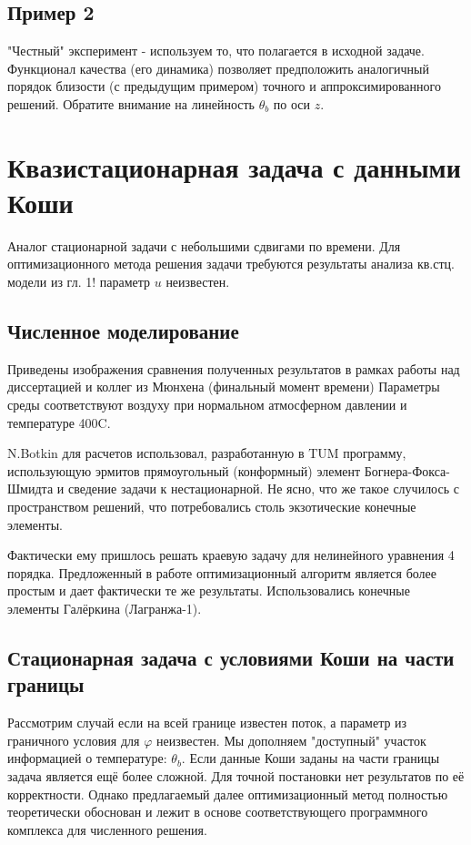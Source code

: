 \documentclass[8pt,a4paper]{article}
\begin{document}
    \vspace{10cm}
    \subsection*{Пример 2}
    "Честный" эксперимент - используем то, что полагается в исходной задаче.
    Функционал качества (его динамика) позволяет предположить аналогичный порядок
    близости (с предыдущим примером)
    точного и аппроксимированного решений.
    Обратите внимание на линейность $\theta_b$ по оси $z$.


    \vspace{10cm}
    \section*{Квазистационарная задача с данными Коши}
    Аналог стационарной задачи с небольшими сдвигами по времени.
    Для оптимизационного метода решения задачи требуются результаты анализа кв.стц. модели из гл. 1!
    параметр $u$ неизвестен.

    \vspace{10cm}
    \subsection*{Численное моделирование}
    Приведены изображения сравнения полученных результатов в рамках работы
    над диссертацией и коллег из Мюнхена (финальный момент времени)
    Параметры среды соответствуют воздуху при нормальном атмосферном давлении и температуре 400C.


    N.Botkin для расчетов использовал, разработанную в TUM программу, использующую
    эрмитов прямоугольный (конформный) элемент Богнера-Фокса-Шмидта и сведение задачи к нестационарной.
    Не ясно, что же такое случилось с пространством решений,
    что потребовались столь экзотические конечные элементы.

    Фактически ему пришлось решать краевую задачу для нелинейного уравнения 4 порядка.
    Предложенный в работе оптимизационный алгоритм является более простым и дает фактически те же результаты.
    Использовались конечные элементы Галёркина (Лагранжа-1).

    \vspace{10cm}
    \subsection*{Стационарная задача с условиями Коши на части границы}
     Рассмотрим случай если на всей границе известен поток, а параметр из граничного условия
    для $\varphi$ неизвестен.
    Мы дополняем "доступный" участок информацией о температуре: $\theta_b$.
    Если данные Коши заданы на части границы задача является ещё более сложной.
    Для точной постановки нет результатов по её корректности.
    Однако предлагаемый далее оптимизационный метод полностью теоретически обоснован и
    лежит в основе соответствующего программного комплекса для численного решения.
\end{document}

